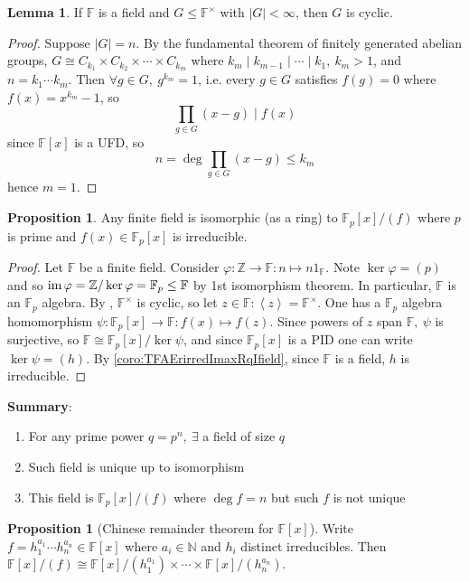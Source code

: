 \documentclass[a4paper]{article}
\newcommand{\la}{\left\langle}
\newcommand{\ra}{\right\rangle}
\newcommand{\N}{\mathbb{N}}
\newcommand{\F}{\mathbb{F}}
\newcommand{\Z}{\mathbb{Z}}
\newcommand{\im}{\text{im\,}}
\theoremstyle{definition}
\newtheorem{prop}[defn]{Proposition}
\newtheorem{lemma}[defn]{Lemma}
\begin{document}
\begin{lemma}
\label{lemma:GcycifGsubgpofFu}
If $\F$ is a field and $G\leq \F^\times$ with $|G|<\infty$, then $G$ is cyclic.
\end{lemma}
\begin{proof}
Suppose $|G|=n$. By the fundamental theorem of finitely generated abelian groups, $G\cong C_{k_1}\times C_{k_2}\times\cdots\times C_{k_m}$ where $k_m\mid k_{m-1}\mid\cdots\mid k_1,\ k_m>1$, and $n=k_1\cdots k_m$. Then $\forall g\in G,\ g^{k_m}=1$, i.e. every $g\in G$ satisfies $f(g)=0$ where $f(x)=x^{k_m}-1$, so
\[
\prod_{g\in G}(x-g)\mid f(x)
\]
since $\F[x]$ is a UFD, so
\[
n=\deg \prod_{g\in G}(x-g)\leq k_m
\]
hence $m=1$.
\end{proof}

\begin{prop}
Any finite field is isomorphic (as a ring) to $\F_p[x]/(f)$ where $p$ is prime and $f(x)\in\F_p[x]$ is irreducible.
\end{prop}
\begin{proof}
Let $\F$ be a finite field. Consider $\varphi:\Z\rightarrow\F:n\mapsto n1_\F$. Note $\ker\varphi=(p)$ and so $\im\varphi=\Z/\ker\varphi=\F_p\leq\F$ by 1st isomorphism theorem. In particular, $\F$ is an $\F_p$ algebra. By \label{lemma:GcycifGsubgpofFu}, $\F^\times$ is cyclic, so let $z\in\F:\la z\ra=\F^\times$. One has a $\F_p$ algebra homomorphism $\psi:\F_p[x]\rightarrow \F:f(x)\mapsto f(z)$. Since powers of $z$ span $\F,\ \psi$ is surjective, so $\F\cong\F_p[x]/\ker\psi$, and since $\F_p[x]$ is a PID one can write $\ker\psi=(h)$. By \ref{coro:TFAErirredImaxRqIfield}, since $\F$ is a field, $h$ is irreducible.
\end{proof}

\textbf{Summary}:
\begin{enumerate}
\item For any prime power $q=p^n,\ \exists$ a field of size $q$
\item Such field is unique up to isomorphism
\item This field is $\F_p[x]/(f)$ where $\deg f=n$ but such $f$ is not unique
\end{enumerate}

\begin{prop}[Chinese remainder theorem for ${\F[x]}$]
Write $f=h_1^{a_1}\cdots h_n^{a_n}\in\F[x]$ where $a_i\in\N$ and $h_i$ distinct irreducibles. Then $\F[x]/(f)\cong\F[x]/(h_1^{a_1})\times\cdots\times\F[x]/(h_n^{a_n})$.
\end{prop}
\end{document}
